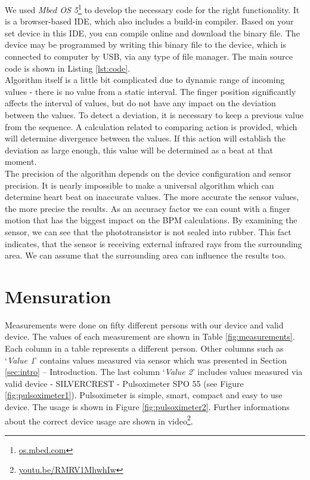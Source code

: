 \documentclass[11pt,a4paper]{article}
\begin{document}
We used \textit{Mbed OS 5}\footnote{\href{https://os.mbed.com/}{os.mbed.com}} to develop the necessary code for the right functionality. It is a browser-based IDE, which also includes a build-in compiler. Based on your set device in this IDE, you can compile online and download the binary file. The device may be programmed by writing this binary file to the device, which is connected to computer by USB, via any type of file manager. The main source code is shown in Listing \ref{lst:code}.\\

Algorithm itself is a little bit complicated due to dynamic range of incoming values - there is no value from a static interval. The finger position significantly affects the interval of values, but do not have any impact on the deviation between the values. To detect a deviation, it is necessary to keep a previous value from the sequence. A calculation related to comparing action is provided, which will determine divergence between the values. If this action will establish the deviation as large enough, this value will be determined as a beat at that moment.\\

The precision of the algorithm depends on the device configuration and sensor precision. It is nearly impossible to make a universal algorithm which can determine heart beat on inaccurate values. The more accurate the sensor values, the more precise the results. As an accuracy factor we can count with a finger motion that has the biggest impact on the BPM calculations. By examining the sensor, we can see that the phototransistor is not sealed into rubber. This fact indicates, that the sensor is receiving external infrared rays from the surrounding area. We can assume that the surrounding area can influence the results too.

\section{Mensuration}

Measurements were done on fifty different persons with our device and valid device. The values of each measurement are shown in Table \ref{fig:measurements}. Each column in a table represents a different person. Other columns such as `\textit{Value 1}' contains values measured via sensor which was presented in Section \ref{sec:intro} -- Introduction. The last column `\textit{Value 2}' includes values measured via valid device - SILVERCREST - Pulsoximeter SPO 55 (see Figure \ref{fig:pulsoximeter1}). Pulsoximeter is simple, smart, compact and easy to use device. The usage is shown in Figure \ref{fig:pulsoximeter2}. Further informations about the correct device usage are shown in video\footnote{\href{https://youtu.be/RMRV1MhwhIw}{youtu.be/RMRV1MhwhIw}}.\\
\end{document}
